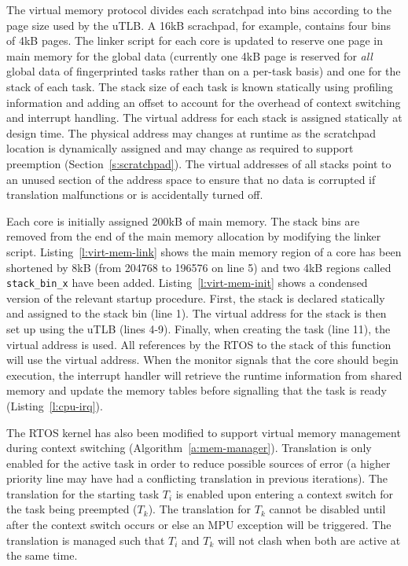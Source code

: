	
	The virtual memory protocol divides each scratchpad into bins according to the page size used by the uTLB. 
	A 16kB scrachpad, for example, contains four bins of 4kB pages.  
	The linker script for each core is updated to reserve one page in main memory for the global data (currently one 4kB page is reserved for \emph{all} global data of fingerprinted tasks rather than on a per-task basis) and one for the stack of each task. 
	The stack size of each task is known statically using profiling information and adding an offset to account for the overhead of context switching and interrupt handling. 
	The virtual address for each stack is assigned statically at design time. 
	The physical address may changes at runtime as the scratchpad location is dynamically assigned and may change as required to support preemption (Section~\ref{s:scratchpad}). 
	The virtual addresses of all stacks point to an unused section of the address space to ensure that no data is corrupted if translation malfunctions or is accidentally turned off.
	
	Each core is initially assigned 200kB of main memory. 
	The stack bins are removed from the end of the main memory allocation by modifying the linker script.
	Listing~\ref{l:virt-mem-link} shows the main memory region of a core has been shortened by 8kB (from 204768 to 196576 on line 5) and two 4kB regions called \texttt{stack\_bin\_x} have been added. 
	Listing~\ref{l:virt-mem-init} shows a condensed version of the relevant startup procedure. 
	First, the stack is declared statically and assigned to the stack bin (line 1). 
	The virtual address for the stack is then set up using the uTLB (lines 4-9). 
	Finally, when creating the task (line 11), the virtual address is used. 
	All references by the RTOS to the stack of this function will use the virtual address. 
	When the monitor signals that the core should begin execution, the interrupt handler will retrieve the runtime information from shared memory and update the memory tables before signalling that the task is ready (Listing~\ref{l:cpu-irq}).



	The RTOS kernel has also been modified to support virtual memory management during context switching (Algorithm~\ref{a:mem-manager}). 
	Translation is only enabled for the active task in order to reduce possible sources of error (a higher priority line may have had a conflicting translation in previous iterations). 
	The translation for the starting task $T_i$ is enabled upon entering a context switch for the task being preempted ($T_k$). 
	The translation for $T_k$ cannot be disabled until after the context switch occurs or else an MPU exception will be triggered. 
	The translation is managed such that $T_i$ and $T_k$ will not clash when both are active at the same time.

